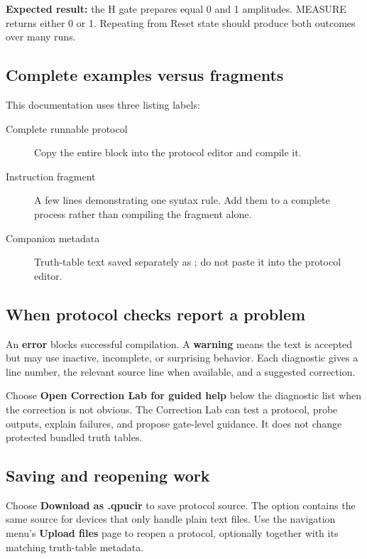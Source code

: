 \textbf{Expected result:} the H gate prepares equal 0 and 1 amplitudes.
MEASURE returns either 0 or 1. Repeating from Reset state should produce both
outcomes over many runs.

\subsection{Complete examples versus fragments}

This documentation uses three listing labels:
\begin{description}
  \item[Complete runnable protocol] Copy the entire block into the protocol
  editor and compile it.
  \item[Instruction fragment] A few lines demonstrating one syntax rule. Add
  them to a complete process rather than compiling the fragment alone.
  \item[Companion metadata] Truth-table text saved separately as
  ; do not paste it into the protocol editor.
\end{description}

\subsection{When protocol checks report a problem}

An \textbf{error} blocks successful compilation. A \textbf{warning} means the
text is accepted but may use inactive, incomplete, or surprising behavior.
Each diagnostic gives a line number, the relevant source line when available,
and a suggested correction.

Choose \textbf{Open Correction Lab for guided help} below the diagnostic list
when the correction is not obvious. The Correction Lab can test a protocol,
probe outputs, explain failures, and propose gate-level guidance. It does not
change protected bundled truth tables.

\subsection{Saving and reopening work}

Choose \textbf{Download as .qpucir} to save protocol source. The
 option contains the same source for devices that only handle
plain text files. Use the navigation menu's \textbf{Upload files} page to
reopen a protocol, optionally together with its matching 
truth-table metadata.
